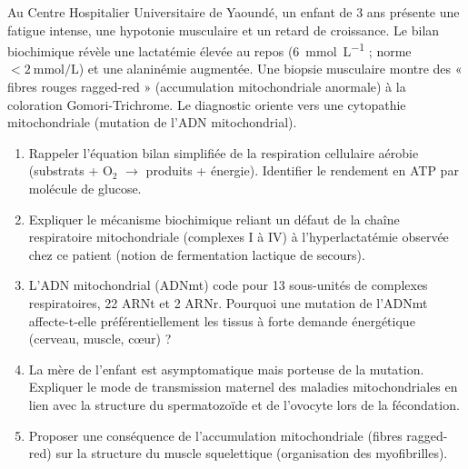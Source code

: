 \documentclass[11pt]{article}
\begin{document}
\begin{exercice}
Au Centre Hospitalier Universitaire de Yaoundé, un enfant de 3 ans présente une fatigue intense, une hypotonie musculaire et un retard de croissance. Le bilan biochimique révèle une lactatémie élevée au repos (\SI{6}{\milli\mole\per\liter} ; norme $< \SI{2}{\milli\mole\per\liter}$) et une alaninémie augmentée. Une biopsie musculaire montre des « fibres rouges ragged-red » (accumulation mitochondriale anormale) à la coloration Gomori-Trichrome. Le diagnostic oriente vers une cytopathie mitochondriale (mutation de l'ADN mitochondrial).

\begin{enumerate}
\item Rappeler l'équation bilan simplifiée de la respiration cellulaire aérobie (substrats + O$_2$ $\rightarrow$ produits + énergie). Identifier le rendement en ATP par molécule de glucose.
\item Expliquer le mécanisme biochimique reliant un défaut de la chaîne respiratoire mitochondriale (complexes I à IV) à l'hyperlactatémie observée chez ce patient (notion de fermentation lactique de secours).
\item L'ADN mitochondrial (ADNmt) code pour 13 sous-unités de complexes respiratoires, 22 ARNt et 2 ARNr. Pourquoi une mutation de l'ADNmt affecte-t-elle préférentiellement les tissus à forte demande énergétique (cerveau, muscle, cœur) ?
\item La mère de l'enfant est asymptomatique mais porteuse de la mutation. Expliquer le mode de transmission maternel des maladies mitochondriales en lien avec la structure du spermatozoïde et de l'ovocyte lors de la fécondation.
\item Proposer une conséquence de l'accumulation mitochondriale (fibres ragged-red) sur la structure du muscle squelettique (organisation des myofibrilles).
\end{enumerate}
\end{exercice}
\end{document}
